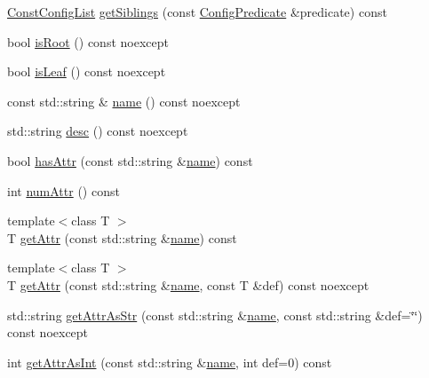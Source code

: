 \begin{DoxyCompactItemize}
\item 
\hyperlink{classtheoria_1_1config_1_1Config_a61230728ffa4d92667a536c8c0f0ca30}{Const\+Config\+List} \hyperlink{classtheoria_1_1config_1_1Config_abb60532c082c92c628ae49ed3b2e9457}{get\+Siblings} (const \hyperlink{classtheoria_1_1config_1_1Config_a293ebfd7146d935e232a066f7e6fa279}{Config\+Predicate} \&predicate) const
\item 
bool \hyperlink{classtheoria_1_1config_1_1Config_ad50b474daddfbec84d7e610f7687fb04}{is\+Root} () const noexcept
\item 
bool \hyperlink{classtheoria_1_1config_1_1Config_ad5c77fb1f86a7df2dce21972f921da33}{is\+Leaf} () const noexcept
\item 
const std\+::string \& \hyperlink{classtheoria_1_1config_1_1Config_af4929f1c9b86576fdc439051a10f89cd}{name} () const noexcept
\item 
std\+::string \hyperlink{classtheoria_1_1config_1_1Config_a4d6b2e26d1139819769eaf6bb959b034}{desc} () const noexcept
\item 
bool \hyperlink{classtheoria_1_1config_1_1Config_a01d4128f1f86ad2ff01dfeb3c52c72f4}{has\+Attr} (const std\+::string \&\hyperlink{classtheoria_1_1config_1_1Config_af4929f1c9b86576fdc439051a10f89cd}{name}) const
\item 
int \hyperlink{classtheoria_1_1config_1_1Config_a733766f29f0b75b7bf1224971968d52c}{num\+Attr} () const
\item 
{\footnotesize template$<$class T $>$ }\\T \hyperlink{classtheoria_1_1config_1_1Config_a0170adaf1d64ada4eafb43758e520837}{get\+Attr} (const std\+::string \&\hyperlink{classtheoria_1_1config_1_1Config_af4929f1c9b86576fdc439051a10f89cd}{name}) const
\item 
{\footnotesize template$<$class T $>$ }\\T \hyperlink{classtheoria_1_1config_1_1Config_ad05bba9dcd7dc78b999f2825fd99f8e0}{get\+Attr} (const std\+::string \&\hyperlink{classtheoria_1_1config_1_1Config_af4929f1c9b86576fdc439051a10f89cd}{name}, const T \&def) const noexcept
\item 
std\+::string \hyperlink{classtheoria_1_1config_1_1Config_a45702e009219115ee14b11ad1f0a851a}{get\+Attr\+As\+Str} (const std\+::string \&\hyperlink{classtheoria_1_1config_1_1Config_af4929f1c9b86576fdc439051a10f89cd}{name}, const std\+::string \&def=\char`\"{}\char`\"{}) const noexcept
\item 
int \hyperlink{classtheoria_1_1config_1_1Config_a991d0271d01d4f77f25a980399e88a60}{get\+Attr\+As\+Int} (const std\+::string \&\hyperlink{classtheoria_1_1config_1_1Config_af4929f1c9b86576fdc439051a10f89cd}{name}, int def=0) const

\end{DoxyCompactItemize}
